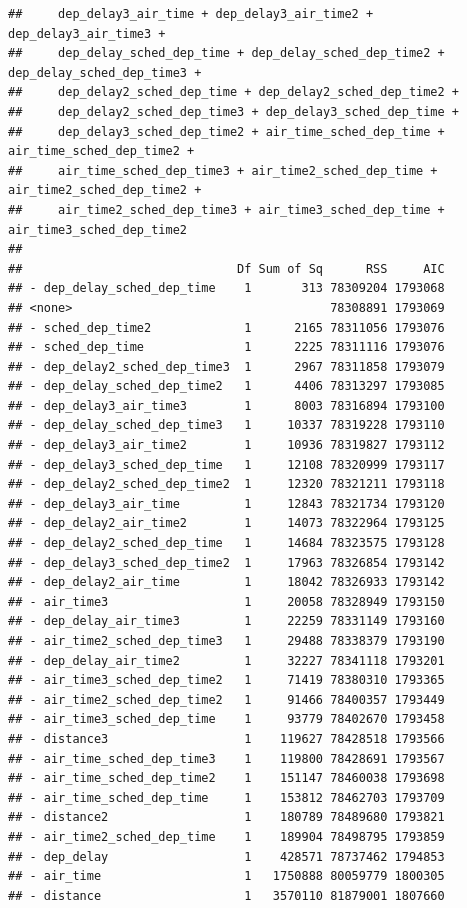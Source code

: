 \documentclass[
]{article}
\begin{document}
\begin{verbatim}
##     dep_delay3_air_time + dep_delay3_air_time2 + dep_delay3_air_time3 + 
##     dep_delay_sched_dep_time + dep_delay_sched_dep_time2 + dep_delay_sched_dep_time3 + 
##     dep_delay2_sched_dep_time + dep_delay2_sched_dep_time2 + 
##     dep_delay2_sched_dep_time3 + dep_delay3_sched_dep_time + 
##     dep_delay3_sched_dep_time2 + air_time_sched_dep_time + air_time_sched_dep_time2 + 
##     air_time_sched_dep_time3 + air_time2_sched_dep_time + air_time2_sched_dep_time2 + 
##     air_time2_sched_dep_time3 + air_time3_sched_dep_time + air_time3_sched_dep_time2
## 
##                              Df Sum of Sq      RSS     AIC
## - dep_delay_sched_dep_time    1       313 78309204 1793068
## <none>                                    78308891 1793069
## - sched_dep_time2             1      2165 78311056 1793076
## - sched_dep_time              1      2225 78311116 1793076
## - dep_delay2_sched_dep_time3  1      2967 78311858 1793079
## - dep_delay_sched_dep_time2   1      4406 78313297 1793085
## - dep_delay3_air_time3        1      8003 78316894 1793100
## - dep_delay_sched_dep_time3   1     10337 78319228 1793110
## - dep_delay3_air_time2        1     10936 78319827 1793112
## - dep_delay3_sched_dep_time   1     12108 78320999 1793117
## - dep_delay2_sched_dep_time2  1     12320 78321211 1793118
## - dep_delay3_air_time         1     12843 78321734 1793120
## - dep_delay2_air_time2        1     14073 78322964 1793125
## - dep_delay2_sched_dep_time   1     14684 78323575 1793128
## - dep_delay3_sched_dep_time2  1     17963 78326854 1793142
## - dep_delay2_air_time         1     18042 78326933 1793142
## - air_time3                   1     20058 78328949 1793150
## - dep_delay_air_time3         1     22259 78331149 1793160
## - air_time2_sched_dep_time3   1     29488 78338379 1793190
## - dep_delay_air_time2         1     32227 78341118 1793201
## - air_time3_sched_dep_time2   1     71419 78380310 1793365
## - air_time2_sched_dep_time2   1     91466 78400357 1793449
## - air_time3_sched_dep_time    1     93779 78402670 1793458
## - distance3                   1    119627 78428518 1793566
## - air_time_sched_dep_time3    1    119800 78428691 1793567
## - air_time_sched_dep_time2    1    151147 78460038 1793698
## - air_time_sched_dep_time     1    153812 78462703 1793709
## - distance2                   1    180789 78489680 1793821
## - air_time2_sched_dep_time    1    189904 78498795 1793859
## - dep_delay                   1    428571 78737462 1794853
## - air_time                    1   1750888 80059779 1800305
## - distance                    1   3570110 81879001 1807660

\end{verbatim}
\end{document}
